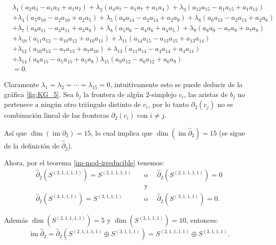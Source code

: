 \documentclass[12pt]{book}
\theoremstyle{definition}
\DeclareMathOperator{\im}{im}
\newcounter{in}
\newcounter{ini}
\begin{document}
\begin{footnotesize}
  \begin{align*}
    &\lambda_{1}(a_{2}a_{3}-a_{1}a_{3}+a_{1}a_{2})+\lambda_{2}(a_{4}a_{7}-a_{1}a_{7}+a_{1}a_{4})+\lambda_{3}(a_{12}a_{15}-a_{1}a_{15}+a_{1}a_{12})\\
    &+\lambda_{4}(a_{5}a_{10}-a_{2}a_{10}+a_{2}a_{5})+\lambda_{5}(a_{9}a_{14}-a_{2}a_{14}+a_{2}a_{9})+\lambda_{6}(a_{6}a_{13}-a_{3}a_{13}+a_{3}a_{6})\\
    &+\lambda_{7}(a_{8}a_{11}-a_{3}a_{11}+a_{3}a_{8})+\lambda_{8}(a_{5}a_{6}-a_{4}a_{6}+a_{4}a_{5})+\lambda_{9}(a_{8}a_{9}-a_{7}a_{9}+a_{7}a_{8})\\
    &+\lambda_{10}(a_{11}a_{12}-a_{10}a_{12}+a_{10}a_{11})+\lambda_{11}(a_{14}a_{15}-a_{13}a_{15}+a_{13}a_{14})\\
    &+\lambda_{12}(a_{10}a_{13}-a_{7}a_{13}+a_{7}a_{10})+\lambda_{13}(a_{11}a_{14}-a_{4}a_{14}+a_{4}a_{11})\\
    &+\lambda_{14}(a_{8}a_{15}-a_{5}a_{15}+a_{5}a_{8})\lambda_{15}(a_{9}a_{12}-a_{6}a_{12}+a_{6}a_{9})\\
    &=0.
  \end{align*}
\end{footnotesize}
Claramente $\lambda_{1}=\lambda_{2}=\cdots=\lambda_{15}=0$,
intuitivamente esto se puede deducir de la gráfica \ref{fig:KG_5}.
Sea $b_{j}$ la frontera de algún $2$-simplejo $c_{i}$, las aristas
de $b_{j}$ no pertenece a ningún otro triángulo distinto de $c_{i}$, por
lo tanto $\partial_{2}(c_{j})$ no es combinación lineal de las fronteras
$\partial_{2}(c_{i})$ con $i\neq j$.

Así que $\dim(\im\partial_{2})=15$, lo cual implica que
$\dim(\im\widehat\partial_{2})=15$ (se sigue de la definición de
$\widehat\partial_{2}$).

Ahora, por el teorema \ref{im-mod-irreducible} tenemos:
\begin{align*}
  \widehat\partial_{2}(S^{(2,1,1,1,1)})=S^{(2,1,1,1,1)} \quad &\mbox{o
  }\quad \widehat\partial_{2}(S^{(2,1,1,1,1)})=0\\
  &\mbox{y}\\
  \widehat\partial_{2}(S^{(3,1,1,1)})=S^{(3,1,1,1)} \quad &\mbox{o }\quad \widehat\partial_{2}(S^{(3,1,1,1)})=0.
\end{align*}

Además $\dim(S^{(2,1,1,1,1)})=5$ y $\dim(S^{(3,1,1,1)})=10$, entonces:
$$\im\widehat\partial_{2}=\widehat\partial_{2}(S^{(2,1,1,1,1)}\oplus S^{(3,1,1,1)})=S^{(2,1,1,1,1)}\oplus S^{(3,1,1,1)}.$$
\end{document}
